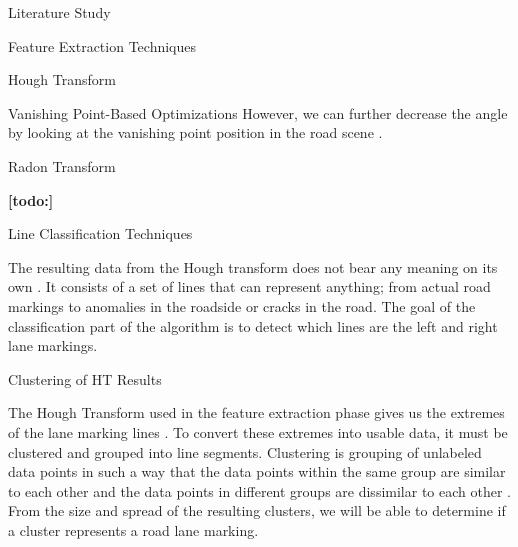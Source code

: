 \documentclass{matthijs}
\begin{document}
\begin{hoofdstuk}{Literature Study}
\begin{paragraaf}{Feature Extraction Techniques}
\begin{subparagraaf}{Hough Transform}
\begin{subsubparagraaf}{Vanishing Point-Based Optimizations}
					However, we can further decrease the angle by looking at the vanishing point position in the road scene \cite{shang2011lane}.

				\end{subsubparagraaf}

			\end{subparagraaf}

			\begin{subparagraaf}{Radon Transform}

				\textbf{[todo:]}

			\end{subparagraaf}
		\end{paragraaf}

		\begin{paragraaf}{Line Classification Techniques}

			The resulting data from the Hough transform does not bear any meaning on its own \cite{gupta2016automated}.
			It consists of a set of lines that can represent anything; from actual road markings to anomalies in the roadside or cracks in the road.
			The goal of the classification part of the algorithm is to detect which lines are the left and right lane markings.

			\begin{subparagraaf}{Clustering of HT Results}

				The Hough Transform used in the feature extraction phase gives us the extremes of the lane marking lines \cite{gupta2016automated}.
				To convert these extremes into usable data, it must be clustered and grouped into line segments.
				Clustering is grouping of unlabeled data points in such a way that the data points within the same group are similar to each other and the data points in different groups are dissimilar to each other \cite{sharma2020kmeans}.
				From the size and spread of the resulting clusters, we will be able to determine if a cluster represents a road lane marking.
				\bigskip


\end{subparagraaf}
\end{paragraaf}
\end{hoofdstuk}
\end{document}
